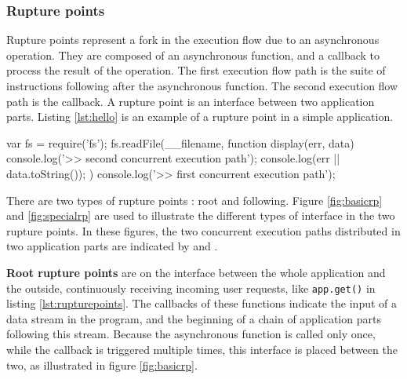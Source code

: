 \subsubsection{Rupture points}

Rupture points represent a fork in the execution flow due to an asynchronous operation.
They are composed of an asynchronous function, and a callback to process the result of the operation.
The first execution flow path is the suite of instructions following after the asynchronous function.
The second execution flow path is the callback.
A rupture point is an interface between two application parts.
Listing \ref{lst:hello} is an example of a rupture point in a simple application.

\begin{code}[js, caption={Example of a rupture point : an asynchronous function call, \texttt{fs.readFile()}, with a callback parameter, \texttt{function display}},label={lst:hello}]
var fs = require('fs');
fs.readFile(__filename, function display(err, data) {
  console.log('>> second concurrent execution path');
  console.log(err || data.toString());
})
console.log('>> first concurrent execution path');
\end{code}


There are two types of rupture points : root and following.
Figure \ref{fig:basicrp} and \ref{fig:specialrp} are used to illustrate the different types of interface in the two rupture points.
In these figures, the two concurrent execution paths distributed in two application parts are indicated by  and .

\textbf{Root rupture points} are on the interface between the whole application and the outside, continuously receiving incoming user requests, like \texttt{app.get()} in listing \ref{lst:rupturepoints}.
The callbacks of these functions indicate the input of a data stream in the program, and the beginning of a chain of application parts following this stream.
Because the asynchronous function is called only once, while the callback is triggered multiple times, this interface is placed between the two, as illustrated in figure \ref{fig:basicrp}.

